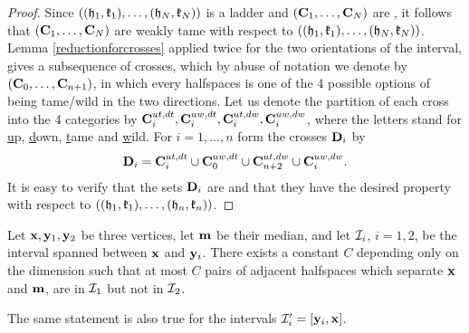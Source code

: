 \begin{proof}
	Since $\left((\mathfrak{h}_{1},\mathfrak{k}_{1}),\ldots,(\mathfrak{h}_{N},\mathfrak{k}_{N})\right)$ is a ladder and $\left(\mathbf{C}_{1},\ldots,\mathbf{C}_{N}\right)$ are \intcs, it follows that $\left(\mathbf{C}_{1},\ldots,\mathbf{C}_{N}\right)$ are weakly tame with respect to $\left((\mathfrak{h}_{1},\mathfrak{k}_{1}),\ldots,(\mathfrak{h}_{N},\mathfrak{k}_{N})\right)$. Lemma \ref{reductionforcrosses} applied twice for the two orientations of the interval, gives a subsequence of crosses, which by abuse of notation we denote by $\left(\mathbf{C}_{0},\ldots,\mathbf{C}_{n+1}\right)$, in which every halfspaces is one of the 4 possible options of being tame/wild in the two directions. 
	Let us denote the partition of each cross into the 4 categories by $\mathbf{C}_i^{ut,dt},\mathbf{C}_i^{uw,dt},\mathbf{C}_i^{ut,dw},\mathbf{C}_i^{uw,dw}$, where the letters stand for \underline{u}p, \underline{d}own, \underline{t}ame and \underline{w}ild.
	For $i=1,\ldots,n$ form the crosses $\mathbf{D}_i$ by \[\mathbf{D}_i = \mathbf{C}_i^{ut,dt}\cup\mathbf{C}_0^{uw,dt}\cup\mathbf{C}_{n+2}^{ut,dw}\cup\mathbf{C}_i^{uw,dw}.\]
	It is easy to verify that the sets $\mathbf{D}_i$  are \intcs and that they have the desired property with respect to $\left((\mathfrak{h}_{1},\mathfrak{k}_{1}),\ldots,(\mathfrak{h}_{n},\mathfrak{k}_{n})\right)$.
\end{proof}


\begin{lemma}\label{lemma2}
	Let $\mathbf{x},\mathbf{y}_1,\mathbf{y}_2$ be three vertices, let $\mathbf{m}$ be their median, and let $\mathcal{I}_i$, $i=1,2$, be the interval spanned between $\mathbf{x}$ and $\mathbf{y}_i$. There exists a constant $C$ depending only on the dimension such that at most $C$ pairs of adjacent halfspaces which separate $\mathbf{x}$ and $\mathbf{m}$, are \adjP in $\mathcal{I}_1$ but not in $\mathcal{I}_2$.
	
	The same statement is also true for the intervals $\mathcal{I}'_i =[\mathbf{y}_i, \mathbf{x}]$.
\end{lemma}

